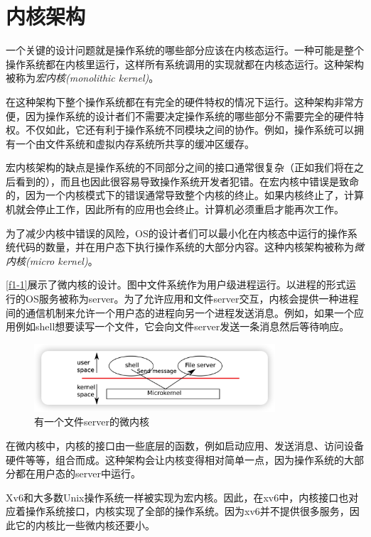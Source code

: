 \section*{内核架构}
一个关键的设计问题就是操作系统的哪些部分应该在内核态运行。一种可能是整个操作系统都在内核里运行，这样所有系统调用的实现就都在内核态运行。这种架构被称为\emph{宏内核(monolithic kernel)}。

在这种架构下整个操作系统都在有完全的硬件特权的情况下运行。这种架构非常方便，因为操作系统的设计者们不需要决定操作系统的哪些部分不需要完全的硬件特权。不仅如此，它还有利于操作系统不同模块之间的协作。例如，操作系统可以拥有一个由文件系统和虚拟内存系统所共享的缓冲区缓存。

宏内核架构的缺点是操作系统的不同部分之间的接口通常很复杂（正如我们将在之后看到的），而且也因此很容易导致操作系统开发者犯错。在宏内核中错误是致命的，因为一个内核模式下的错误通常导致整个内核的终止。如果内核终止了，计算机就会停止工作，因此所有的应用也会终止。计算机必须重启才能再次工作。

为了减少内核中错误的风险，OS的设计者们可以最小化在内核态中运行的操作系统代码的数量，并在用户态下执行操作系统的大部分内容。这种内核架构被称为\emph{微内核(micro kernel)}。

\autoref{f1-1}展示了微内核的设计。图中文件系统作为用户级进程运行。以进程的形式运行的OS服务被称为server。为了允许应用和文件server交互，内核会提供一种进程间的通信机制来允许一个用户态的进程向另一个进程发送消息。例如，如果一个应用例如shell想要读写一个文件，它会向文件server发送一条消息然后等待响应。

\begin{figure}[htbp]
    \centering
    \includegraphics[width=0.8\textwidth]{../imgs/f1-1.png}
    \caption{有一个文件server的微内核}
    \label{f1-1}
\end{figure}

在微内核中，内核的接口由一些底层的函数，例如启动应用、发送消息、访问设备硬件等等，组合而成。这种架构会让内核变得相对简单一点，因为操作系统的大部分都在用户态的server中运行。

Xv6和大多数Unix操作系统一样被实现为宏内核。因此，在xv6中，内核接口也对应着操作系统接口，内核实现了全部的操作系统。因为xv6并不提供很多服务，因此它的内核比一些微内核还要小。

